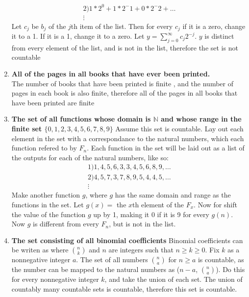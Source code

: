 \documentclass{article}
\begin{document}
\begin{enumerate}[label=\textbf{\alph*)}]
\begin{align*}
        \text{2)} 1*2^0 + 1*2^-1 + 0 *2^-2+\dots\\
        \vdots
    \end{align*}
    Let $c_j$ be $b_j$ of the $j$th item of the list. Then for every $c_j$ if it is a zero, change it to a 1. If it is a 1, change it to a zero. Let $y = \sum^{\infty}_{j=0} c_j 2^{-j}$. $y$ is distinct from every element of the list, and is not in the list, therefore the set is not countable
    \item \textbf{All of the pages in all books that have ever been printed.}\\
    The number of books that have been printed is finite , and the number of pages in each book is also finite, therefore all of the pages in all books that have been printed are finite\\
    \item \textbf{The set of all functions whose domain is $\mathbb{N}$ and whose range in the finite set $\{0,1,2,3,4,5,6,7,8,9\}$}
    Assume this set is countable. Lay out each element in the set with a correspondance to the natural numbers, which each function refered to by $F_n$. Each function in the set will be laid out as a list of the outputs for each of the natural numbers, like so:
    \begin{align*}
        \text{1)}  1,4,5,6,3,3,4,5,6,8,9,\dots \\
        \text{2)}  4,5,7,3,7,8,9,5,4,4,5,\dots\\
        \vdots
    \end{align*}
    Make another function $g$, where $g$ has the same domain and range as the functions in the set. Let $g(x)=$ the $x$th element of the $F_x$. Now for shift the value of the function $g$ up by 1, making it 0 if it is 9 for every $g(n)$. Now $g$ is different from every $F_n$, but is not in the list.
    \item \textbf{The set consisting of all binomial coefficients}
    Binomial coefficients can be writen as where $n\choose k$ and $n$ are integers such that $n \ge k \ge 0$. Fix $k$ as a nonnegative integer $a$. The set of all numbers $n\choose a$ for $n \ge a$ is countable, as the number can be mapped to the natural numbers as ($n-a$, $n\choose a$). Do this for every nonnegative integer $k$, and take the union of each set. The union of countably many countable sets is countable, therefore this set is countable.
\end{enumerate}
\end{document}
